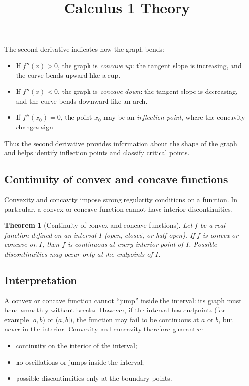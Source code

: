 \documentclass[11pt,a4paper]{article} \usepackage[T1]{fontenc}
\theoremstyle{plain} \newtheorem{theorem}{Theorem} \title{Calculus 1 Theory}
\begin{document}
The second derivative indicates how the graph bends:

\begin{itemize}
\item If $f''(x) > 0$, the graph is \emph{concave up}: the tangent slope is
increasing, and the curve bends upward like a cup.
\item If $f''(x) < 0$, the graph is \emph{concave down}: the tangent slope is
decreasing, and the curve bends downward like an arch.
\item If $f''(x_0) = 0$, the point $x_0$ may be an \emph{inflection point},
where the concavity changes sign.
\end{itemize}

Thus the second derivative provides information about the shape of the graph
and helps identify inflection points and classify critical points.

\subsection {Continuity of convex and concave functions}

Convexity and concavity impose strong regularity conditions on a function. In
particular, a convex or concave function cannot have interior discontinuities.

\begin{theorem}
[Continuity of convex and concave functions] Let $f$ be a real function defined
on an interval $I$ (open, closed, or half-open). If $f$ is convex or concave on
$I$, then $f$ is continuous at every interior point of $I$. Possible
discontinuities may occur only at the endpoints of $I$.
\end{theorem}

\subsection*{Interpretation}

A convex or concave function cannot “jump” inside the interval: its graph must
bend smoothly without breaks. However, if the interval has endpoints (for
example $[a,b)$ or $(a,b]$), the function may fail to be continuous at $a$ or
$b$, but never in the interior. Convexity and concavity therefore guarantee:

\begin{itemize}
\item continuity on the interior of the interval;
\item no oscillations or jumps inside the interval;
\item possible discontinuities only at the boundary points.
\end{itemize}
\end{document}
